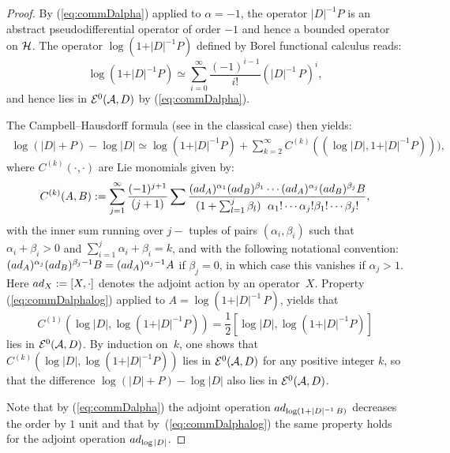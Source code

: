 \documentclass[11pt]{article}
\numberwithin{equation}{section}
\begin{document}
\begin{proof} By  (\ref{eq:commDalpha}) applied to $\alpha=-1$, the operator
$\vert D\vert^{-1}  P$ is an abstract pseudodif\/ferential operator of order $-1$
and hence a bounded operator on ${\cal H}$.   The operator $\log   (1+\vert
D\vert^{-1}  P)$
    def\/ined by  Borel functional calculus reads:
\[
\log  (1+\vert D\vert^{-1}  P)\simeq \sum_{i=0}^\infty
\frac{(-1)^{i-1}}{i!} (\vert D\vert^{-1}\, P)^i,
\] and hence lies in
   ${\cal E}^0({\cal A}, D)$ by (\ref{eq:commDalpha}).


The Campbell--Hausdorf\/f formula (see \cite{O} in the classical case) then yields:
\begin{gather*} \log   (\vert D\vert+P) -\log  \vert D\vert  \simeq
 \log (1+ \vert D\vert^{-1}  P) +\sum_{k=2}^{\infty } C^{(k)}(
  (\log \vert D\vert, 1+ \vert D\vert^{-1}  P) )
  ),
\end{gather*}where  $C^{(k)}( \cdot , \cdot)$ are  Lie monomials given by:
\[
C^{(k)}(A,B):=\sum\limits_{j=1}^\infty \frac{(-1)^{j+1}}{(j+1)} \sum
\frac{({\rm ad }_A)^{\alpha_1}({\rm ad }_B)^{\beta_1}\cdots
 ({\rm ad }_A)^{\alpha_j}({\rm ad }_B)^{\beta_j}B}{(1+ \sum_{l=1}^j
  \beta_l)\\  \alpha_1!\cdots\alpha_j! \beta_1!\cdots\beta_j!},
 \]
  with the inner sum running over $j-$ tuples of pairs $(\alpha_i,
  \beta_i)$ such that $\alpha_i\!+\!\beta_i\!>\!0$ and $\sum\limits_{i=1}^j
  \alpha_i\!+\! \beta_i\!=\! k$, and with the following notational convention:
   $ ({\rm ad
  }_A)^{\alpha_j}({\rm ad }_B)^{\beta_j-1} B=  ({\rm ad
  }_A)^{\alpha_j-1}  A$ if $\beta_j=0$,  in which case this vanishes if
  $\alpha_j>1$. Here ${\rm ad}_X:=[X, \cdot]$ denotes the adjoint
  action  by an opera\-tor~$X$. Property (\ref{eq:commDalphalog}) applied to $A=
  \log(1+ \vert D\vert^{-1}\,P)$,
   yields that
   \[
    C^{(1)}\left(\log \vert D \vert,
  \log(1+ \vert D\vert^{-1} P)\right)= \frac{1}{2}
\left[ \log \vert D \vert,  \log(1+ \vert D\vert^{-1} P)\right]
\] lies in
${\cal E}^0({\cal A}, D)$. By induction on~$k$, one shows that
$
C^{(k)}\left(\log \vert D \vert,
  \log(1+ \vert D\vert^{-1} P)\right)
$  lies in
${\cal E}^0({\cal A}, D)$ for any positive integer $k$,  so that   the
  dif\/ference $\log (\vert D\vert+P)-\log \vert D\vert $ also lies in ${\cal
  E}^0({\cal A}, D)$.

 Note that by (\ref{eq:commDalpha}) the adjoint operation
    ${\rm ad }_{\log(1+ \vert D\vert^{-1}\,B)} $  decreases the order by $1$
     unit and that   by~(\ref{eq:commDalphalog}) the same property holds
      for  the adjoint operation  ${\rm ad }_{\log \vert D\vert} $.  \end{proof}
\end{document}
